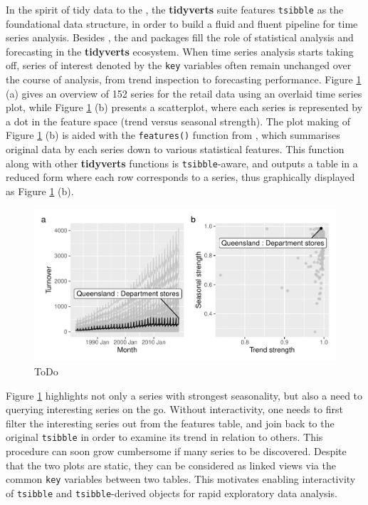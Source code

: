 In the spirit of tidy data to the 
\citep{Wickham2019}, the \textbf{tidyverts} suite features
\texttt{tsibble} as the foundational data structure, in order to build a
fluid and fluent pipeline for time series analysis. Besides
, the  and  packages
fill the role of statistical analysis and forecasting in the
\textbf{tidyverts} ecosystem. When time series analysis starts taking
off, series of interest denoted by the \texttt{key} variables often
remain unchanged over the course of analysis, from trend inspection to
forecasting performance. Figure \ref{fig:highlight-retail} (a) gives an
overview of 152 series for the retail data using an overlaid time series
plot, while Figure \ref{fig:highlight-retail} (b) presents a
scatterplot, where each series is represented by a dot in the feature
space (trend versus seasonal strength). The plot making of Figure
\ref{fig:highlight-retail} (b) is aided with the \texttt{features()}
function from , which summarises original data by each
series down to various statistical features. This function along with
other \textbf{tidyverts} functions is \texttt{tsibble}-aware, and
outputs a table in a reduced form where each row corresponds to a
series, thus graphically displayed as Figure \ref{fig:highlight-retail}
(b).

\begin{Schunk}
\begin{figure}

{\centering \includegraphics[width=\textwidth]{figure/highlight-retail-1} 

}

\caption[ToDo]{ToDo}\label{fig:highlight-retail}
\end{figure}
\end{Schunk}

Figure \ref{fig:highlight-retail} highlights not only a series with
strongest seasonality, but also a need to querying interesting series on
the go. Without interactivity, one needs to first filter the interesting
series out from the features table, and join back to the original
\texttt{tsibble} in order to examine its trend in relation to others.
This procedure can soon grow cumbersome if many series to be discovered.
Despite that the two plots are static, they can be considered as linked
views via the common \texttt{key} variables between two tables. This
motivates enabling interactivity of \texttt{tsibble} and
\texttt{tsibble}-derived objects for rapid exploratory data analysis.

